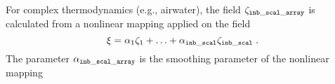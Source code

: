 For complex thermodynamics (e.g., airwater), the field $\zeta_\mathrm{\tt inb\_scal\_array}$ is calculated from a nonlinear mapping applied on the field
\begin{equation}
\xi =\alpha_1\zeta_1+\ldots+\alpha_\mathrm{\tt inb\_scal}\zeta_\mathrm{\tt inb\_scal}\;.
\end{equation}
The parameter $\alpha_\mathrm{\tt inb\_scal\_array}$ is the smoothing parameter of the nonlinear mapping
